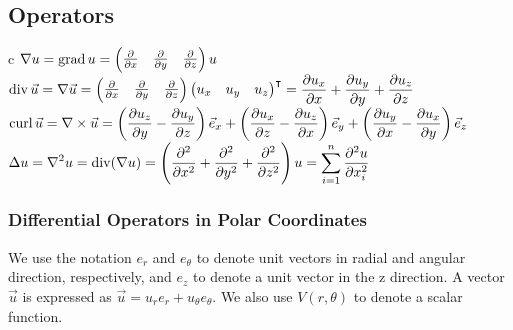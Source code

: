 \documentclass[a4paper]{article}
\begin{document}
\begin{twocolumn}
\subsection{Operators}

\begin{center}
	\begin{mtabular}{c}
		$\displaystyle \nabla u = \operatorname{grad} u = \begin{pmatrix} \frac{\partial }{\partial x} & \frac{\partial }{\partial y} & \frac{\partial }{\partial z}  \end{pmatrix} u$ \\
		$\displaystyle \operatorname{div} \vec u = \nabla \vec u = \begin{pmatrix} \frac{\partial }{\partial x} & \frac{\partial }{\partial y} & \frac{\partial }{\partial z} \end{pmatrix} \begin{pmatrix} u_x & u_y & u_z	\end{pmatrix}^\intercal = \frac{\partial u_x}{\partial x} + \frac{\partial u_y}{\partial y} + \frac{\partial u_z}{\partial z}$\\
		$\displaystyle \operatorname{curl} \vec u = \nabla \times \vec u = \left( \frac{\partial u_z}{\partial y} - \frac{\partial u_y}{\partial z} \right) \vec e_x + \left( \frac{\partial u_x}{\partial z} - \frac{\partial u_z}{\partial x} \right) \vec e_y + \left( \frac{\partial u_y}{\partial x} - \frac{\partial u_x}{\partial y} \right) \vec e_z $\\
		$\displaystyle \Delta u = \nabla^2 u = \operatorname{div}(\nabla u) =  \left(\frac{\partial^2 }{\partial x ^2} + \frac{\partial^2 }{\partial y ^2} + \frac{\partial^2 }{\partial z ^2}\right) u = \sum_{i=1}^n \frac{\partial^2 u}{\partial x_i ^2}$
	\end{mtabular}
\end{center}

\pagebreak
\subsubsection{Differential Operators in Polar Coordinates}

We use the notation $e_r$ and $e_\theta$ to denote unit vectors in radial and angular direction, respectively, and $e_z$ to denote a unit vector in the z direction. A vector $\vec u$ is expressed as $\vec u = u_r e_r + u_\theta e_\theta$. We also use $V(r,\theta)$ to denote a scalar function.


\end{twocolumn}
\end{document}
